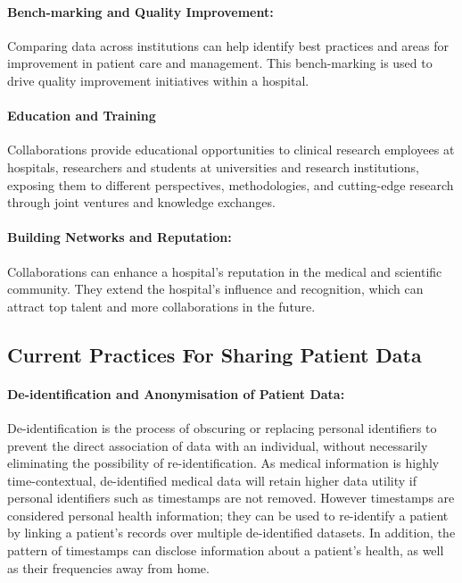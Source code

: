 \documentclass[11pt]{article}
\begin{document}
\paragraph{Bench-marking and Quality Improvement:} Comparing data across institutions can help identify best practices and areas for improvement in patient care and management. This bench-marking is used to drive quality improvement initiatives within a hospital\cite{Werner2005}.

\paragraph{Education and Training} Collaborations provide educational opportunities to clinical research employees at hospitals, researchers and students at universities and research institutions, exposing them to different perspectives, methodologies, and cutting-edge research through joint ventures and knowledge exchanges.

\paragraph{Building Networks and Reputation:} Collaborations can enhance a hospital’s reputation in the medical and scientific community\cite{Vasan2021}. They extend the hospital’s influence and recognition, which can attract top talent and more collaborations in the future.

\subsection{Current Practices For Sharing Patient Data}

\paragraph{De-identification and Anonymisation of Patient Data:}
De-identification is the process of obscuring or replacing personal identifiers to prevent the direct association of data with an individual, without necessarily eliminating the possibility of re-identification. As medical information is highly time-contextual, de-identified medical data will retain higher data utility if personal identifiers such as timestamps are not removed.  However timestamps are considered personal health information; they can be used to re-identify a patient by linking a patient's records over multiple de-identified datasets. In addition, the pattern of timestamps can disclose information about a patient's health, as well as their frequencies away from home.
\end{document}

